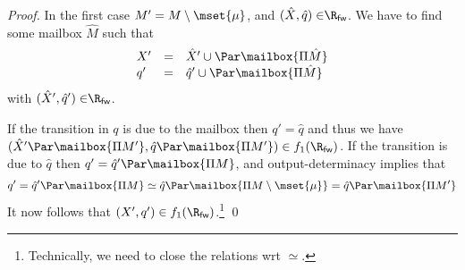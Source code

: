 {\begin{proof}
    In the first case  $M' = M \setminus \mset{ \mu }$, and
    $(\hat{X}, \hat{q}) \in \Rfw$.
    We have to find some mailbox $\hat{M}$ such that
    $$
    \begin{array}{lll}
      X' & = & \hat{X}' \cup \Par \mailbox{\Pi \hat{M}}\\
      q' & = & \hat{q}' \cup \Par \mailbox{\Pi \hat{M}}\\
    \end{array}
    $$
    with $( \hat{X}',  \hat{q}') \in \Rfw$.

    If the transition in $q$ is due to the mailbox then
    $q' = \hat{q}$ and thus we have $(\hat{X}' \Par \mailbox{\Pi M'}, \hat{q} \Par \mailbox{\Pi M'}) \in f_1(\Rfw)$.
    If the transition is due to $\hat{q}$ then
    $ q' = \hat{q}' \Par \mailbox{\Pi M}$, and
    output-determinacy implies
    that
    $$
    q' =  \hat{q}' \Par \mailbox{\Pi M} \simeq \hat{q} \Par \mailbox{\Pi M \setminus \mset{ \mu }} = \hat{q} \Par \mailbox{\Pi M'}
    $$
    It now follows that $ (X', q') \in f_1(\Rfw) $.\footnote{Technically, we need to close the relations wrt $\simeq$.}
    \qed
  \end{proof}
  
  }
